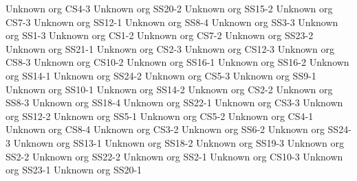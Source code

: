 \begin{multicols}{2}
{Unknown org}
{CS4-3}
{}
{Unknown org}
{SS20-2}
{}
{Unknown org}
{SS15-2}
{}
{Unknown org}
{CS7-3}
{}
{Unknown org}
{SS12-1}
{}
{Unknown org}
{SS8-4}
{}
{Unknown org}
{SS3-3}
{}
{Unknown org}
{SS1-3}
{}
{Unknown org}
{CS1-2}
{}
{Unknown org}
{CS7-2}
{}
{Unknown org}
{SS23-2}
{}
{Unknown org}
{SS21-1}
{}
{Unknown org}
{CS2-3}
{}
{Unknown org}
{CS12-3}
{}
{Unknown org}
{CS8-3}
{}
{Unknown org}
{CS10-2}
{}
{Unknown org}
{SS16-1}
{}
{Unknown org}
{SS16-2}
{}
{Unknown org}
{SS14-1}
{}
{Unknown org}
{SS24-2}
{}
{Unknown org}
{CS5-3}
{}
{Unknown org}
{SS9-1}
{}
{Unknown org}
{SS10-1}
{}
{Unknown org}
{SS14-2}
{}
{Unknown org}
{CS2-2}
{}
{Unknown org}
{SS8-3}
{}
{Unknown org}
{SS18-4}
{}
{Unknown org}
{SS22-1}
{}
{Unknown org}
{CS3-3}
{}
{Unknown org}
{SS12-2}
{}
{Unknown org}
{SS5-1}
{}
{Unknown org}
{CS5-2}
{}
{Unknown org}
{CS4-1}
{}
{Unknown org}
{CS8-4}
{}
{Unknown org}
{CS3-2}
{}
{Unknown org}
{SS6-2}
{}
{Unknown org}
{SS24-3}
{}
{Unknown org}
{SS13-1}
{}
{Unknown org}
{SS18-2}
{}
{Unknown org}
{SS19-3}
{}
{Unknown org}
{SS2-2}
{}
{Unknown org}
{SS22-2}
{}
{Unknown org}
{SS2-1}
{}
{Unknown org}
{CS10-3}
{}
{Unknown org}
{SS23-1}
{}
{Unknown org}
{SS20-1}
{}

\end{multicols}
